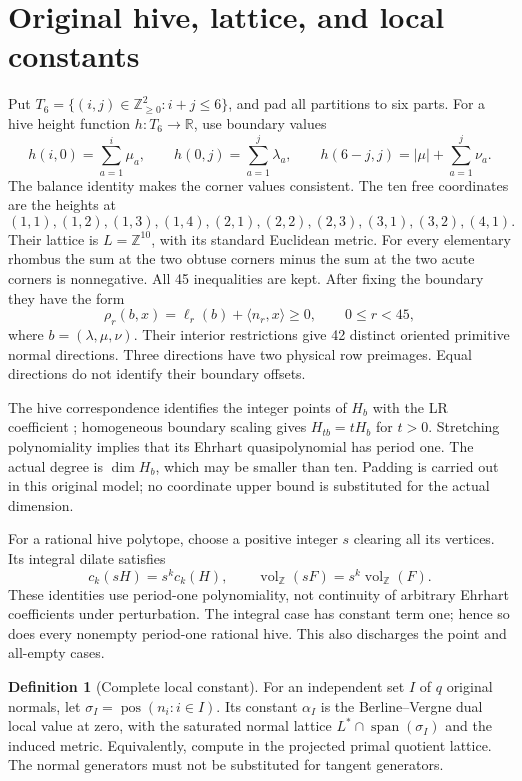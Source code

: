 \documentclass[11pt]{article}
\theoremstyle{definition}\newtheorem{definition}[theorem]{Definition}
\theoremstyle{remark}\newtheorem{remark}[theorem]{Remark}
\newcommand{\Z}{\mathbb Z}\newcommand{\Q}{\mathbb Q}\newcommand{\R}{\mathbb R}
\newcommand{\vol}{\operatorname{vol}_{\Z}}
\newcommand{\pos}{\operatorname{pos}}\newcommand{\rank}{\operatorname{rank}}
\begin{document}
\section{Original hive, lattice, and local constants}\label{sec:model}
Put \(T_6=\{(i,j)\in\Z_{\geq0}^2:i+j\leq6\}\), and pad all partitions
to six parts. For a hive height function \(h:T_6\to\R\), use boundary values
\[
 h(i,0)=\sum_{a=1}^i\mu_a,\qquad
 h(0,j)=\sum_{a=1}^j\lambda_a,\qquad
 h(6-j,j)=|\mu|+\sum_{a=1}^j\nu_a.
\]
The balance identity makes the corner values consistent. The ten free
coordinates are the heights at
\[
(1,1),(1,2),(1,3),(1,4),(2,1),(2,2),(2,3),(3,1),(3,2),(4,1).
\]
Their lattice is \(L=\Z^{10}\), with its standard Euclidean metric.
For every elementary rhombus the sum at the two obtuse corners minus the
sum at the two acute corners is nonnegative. All 45 inequalities are kept.
After fixing the boundary they have the form
\begin{equation}\label{eq:rhombi}
 \rho_r(b,x)=\ell_r(b)+\langle n_r,x\rangle\geq0,
 \qquad 0\leq r<45,
\end{equation}
where \(b=(\lambda,\mu,\nu)\). Their interior restrictions give 42
distinct oriented primitive normal directions. Three directions have two
physical row preimages. Equal directions do not identify their boundary
offsets.

The hive correspondence identifies the integer points of \(H_b\) with
the LR coefficient \cite{kt}; homogeneous boundary scaling gives
\(H_{tb}=tH_b\) for \(t>0\). Stretching polynomiality implies that its Ehrhart
quasipolynomial has period one. The actual degree is \(\dim H_b\), which
may be smaller than ten. Padding is carried out in this original model;
no coordinate upper bound is substituted for the actual dimension.

For a rational hive polytope, choose a positive integer \(s\) clearing all its
vertices. Its integral dilate satisfies
\begin{equation}\label{eq:scaling}
 c_k(sH)=s^k c_k(H),\qquad \vol(sF)=s^k\vol(F).
\end{equation}
These identities use period-one polynomiality, not continuity of arbitrary
Ehrhart coefficients under perturbation. The integral case has constant term
one; hence so does every nonempty period-one rational hive. This also
discharges the point and all-empty cases.

\begin{definition}[Complete local constant]
For an independent set \(I\) of \(q\) original normals, let
\(\sigma_I=\pos(n_i:i\in I)\). Its constant \(\alpha_I\) is the
Berline--Vergne dual local value at zero, with the saturated normal lattice
\(L^*\cap\operatorname{span}(\sigma_I)\) and the induced metric.
Equivalently, compute in the projected primal quotient lattice. The normal
generators must not be substituted for tangent generators.
\end{definition}
\end{document}

